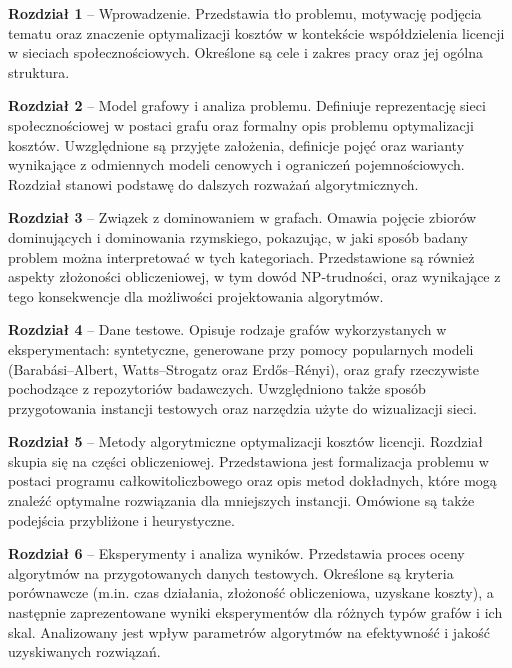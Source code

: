 \begin{description}
  \item \textbf{Rozdział 1} -- Wprowadzenie. Przedstawia tło problemu, motywację podjęcia tematu oraz znaczenie optymalizacji kosztów w kontekście współdzielenia licencji w sieciach społecznościowych. Określone są cele i zakres pracy oraz jej ogólna struktura.

  \item \textbf{Rozdział 2} -- Model grafowy i analiza problemu. Definiuje reprezentację sieci społecznościowej w postaci grafu oraz formalny opis problemu optymalizacji kosztów. Uwzględnione są przyjęte założenia, definicje pojęć oraz warianty wynikające z odmiennych modeli cenowych i ograniczeń pojemnościowych. Rozdział stanowi podstawę do dalszych rozważań algorytmicznych.

  \item \textbf{Rozdział 3} -- Związek z dominowaniem w grafach. Omawia pojęcie zbiorów dominujących i dominowania rzymskiego, pokazując, w jaki sposób badany problem można interpretować w tych kategoriach. Przedstawione są również aspekty złożoności obliczeniowej, w tym dowód NP-trudności, oraz wynikające z tego konsekwencje dla możliwości projektowania algorytmów.

  \item \textbf{Rozdział 4} -- Dane testowe. Opisuje rodzaje grafów wykorzystanych w eksperymentach: syntetyczne, generowane przy pomocy popularnych modeli (Barabási--Albert, Watts--Strogatz oraz Erdős--Rényi), oraz grafy rzeczywiste pochodzące z repozytoriów badawczych. Uwzględniono także sposób przygotowania instancji testowych oraz narzędzia użyte do wizualizacji sieci.

  \item \textbf{Rozdział 5} -- Metody algorytmiczne optymalizacji kosztów licencji. Rozdział skupia się na części obliczeniowej. Przedstawiona jest formalizacja problemu w postaci programu całkowitoliczbowego oraz opis metod dokładnych, które mogą znaleźć optymalne rozwiązania dla mniejszych instancji. Omówione są także podejścia przybliżone i heurystyczne.

  \item \textbf{Rozdział 6} -- Eksperymenty i analiza wyników. Przedstawia proces oceny algorytmów na przygotowanych danych testowych. Określone są kryteria porównawcze (m.in. czas działania, złożoność obliczeniowa, uzyskane koszty), a następnie zaprezentowane wyniki eksperymentów dla różnych typów grafów i ich skal. Analizowany jest wpływ parametrów algorytmów na efektywność i jakość uzyskiwanych rozwiązań.


\end{description}
